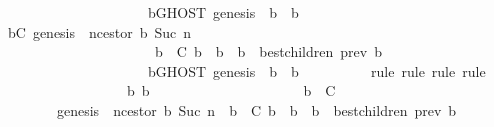 \begin{isabellebody}
\ \ \ \ \ \ \ \ \ \ \ \ \ \ \ \ \ \ \ \ \ \ {\isacharparenleft}{\isasymforall}b{\isacharprime}{\isacharprime}{\isasymin}GHOST\ {\isacharparenleft}{\isacharbraceleft}genesis{\isacharbraceright}{\isacharcomma}\ {\isasymsigma}{\isacharparenright}{\isachardot}\ b\ {\isasymdownharpoonright}\ b{\isacharprime}{\isacharprime}{\isacharparenright}{\isachardoublequoteclose}\ \isanewline
\ \ \ \ \ \ \isamarkupfalse%
\ {\isachardoublequoteopen}{\isasymforall}{\isasymsigma}{\isasymin}{\isasymSigma}{\isachardot}\ {\isasymforall}b{\isasymin}C{\isachardot}\ genesis\ {\isacharequal}\ n{\isacharunderscore}cestor\ {\isacharparenleft}b{\isacharcomma}\ Suc\ n{\isacharparenright}\ {\isasymand}\isanewline
\ \ \ \ \ \ \ \ \ \ \ \ \ \ \ \ \ \ \ \ \ \ {\isacharparenleft}{\isasymforall}\ b{\isacharprime}\ {\isasymin}\ C{\isachardot}\ b{\isacharprime}\ {\isasymdownharpoonright}\ b\ {\isasymlongrightarrow}\ b{\isacharprime}\ {\isasymin}\ best{\isacharunderscore}children\ {\isacharparenleft}prev\ b{\isacharprime}{\isacharcomma}\ {\isasymsigma}{\isacharparenright}{\isacharparenright}\ {\isasymlongrightarrow}\isanewline
\ \ \ \ \ \ \ \ \ \ \ \ \ \ \ \ \ \ \ \ \ \ {\isacharparenleft}{\isasymforall}b{\isacharprime}{\isacharprime}{\isasymin}GHOST\ {\isacharparenleft}{\isacharbraceleft}genesis{\isacharbraceright}{\isacharcomma}\ {\isasymsigma}{\isacharparenright}{\isachardot}\ b\ {\isasymdownharpoonright}\ b{\isacharprime}{\isacharprime}{\isacharparenright}{\isachardoublequoteclose}\isanewline
\ \ \ \ \ \ \ \ \isamarkupfalse%
\ {\isacharparenleft}rule{\isacharcomma}\ rule{\isacharcomma}\ rule{\isacharcomma}\ rule{\isacharparenright}\isanewline
\ \ \ \ \ \ \isamarkupfalse%
\ {\isacharminus}\isanewline
\ \ \ \ \ \ \ \ \isamarkupfalse%
\ {\isasymsigma}\ b\ b{\isacharprime}{\isacharprime}\isanewline
\ \ \ \ \ \ \ \ \isamarkupfalse%
\ {\isachardoublequoteopen}{\isasymsigma}\ {\isasymin}\ {\isasymSigma}{\isachardoublequoteclose}\isanewline
\ \ \ \ \ \ \ \ \ {\isachardoublequoteopen}b\ {\isasymin}\ C{\isachardoublequoteclose}\isanewline
\ \ \ \ \ \ \ \ \ {\isachardoublequoteopen}genesis\ {\isacharequal}\ n{\isacharunderscore}cestor\ {\isacharparenleft}b{\isacharcomma}\ Suc\ n{\isacharparenright}\ {\isasymand}\ {\isacharparenleft}{\isasymforall}b{\isacharprime}\ {\isasymin}\ C{\isachardot}\ b{\isacharprime}\ {\isasymdownharpoonright}\ b\ {\isasymlongrightarrow}\ b{\isacharprime}\ {\isasymin}\ best{\isacharunderscore}children\ {\isacharparenleft}prev\ b{\isacharprime}{\isacharcomma}\ {\isasymsigma}{\isacharparenright}{\isacharparenright}{\isachardoublequoteclose}\isanewline

\end{isabellebody}
